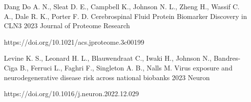 

\begin{cventries}
 \cventry
  {Dang Do A. N., Sleat D. E., Campbell K., Johnson N. L., Zheng H., Wassif C. A., Dale R. K., Porter F. D.} %
  {Cerebrospinal Fluid Protein Biomarker Discovery in CLN3} %
  {2023} %
  {Journal of Proteome Research}
  {
    \begin{cvitems} %
    \item {https://doi.org/10.1021/acs.jproteome.3c00199}
    \end{cvitems}
  }
  \cventry
  {Levine K. S., Leonard H. L., Blauwendraat C., Iwaki H., Johnson N., Bandres-Ciga B., Ferruci L., Faghri F., Singleton A. B., Nalls M.} %
  {Virus exposure and neurodegenerative disease risk across national biobanks} %
  {2023} %
  {Neuron}
  {
    \begin{cvitems} %
    \item {https://doi.org/10.1016/j.neuron.2022.12.029}
    \end{cvitems}
  }
  

\end{cventries}
